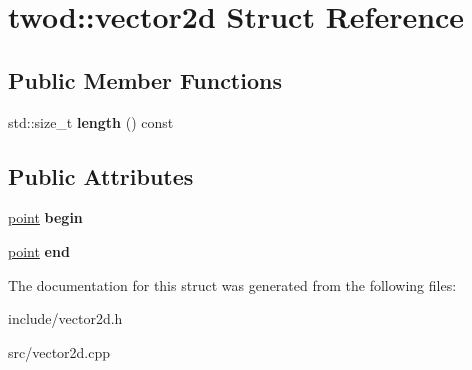 \hypertarget{structtwod_1_1vector2d}{}\section{twod\+:\+:vector2d Struct Reference}
\label{structtwod_1_1vector2d}
\subsection*{Public Member Functions}
\begin{DoxyCompactItemize}
\item 
\mbox{\label{structtwod_1_1vector2d_a6fa6f88e079c3cf58ee67935001eddfd}} 
std\+::size\+\_\+t {\bfseries length} () const
\end{DoxyCompactItemize}
\subsection*{Public Attributes}
\begin{DoxyCompactItemize}
\item 
\mbox{\label{structtwod_1_1vector2d_a549e1fd383dce218a88517d3cdbbede7}} 
\hyperlink{structtwod_1_1point__t}{point} {\bfseries begin}
\item 
\mbox{\label{structtwod_1_1vector2d_af08faedb9ce9a14990f7cc31e41ab66d}} 
\hyperlink{structtwod_1_1point__t}{point} {\bfseries end}
\end{DoxyCompactItemize}


The documentation for this struct was generated from the following files\+:\begin{DoxyCompactItemize}
\item 
include/vector2d.\+h\item 
src/vector2d.\+cpp\end{DoxyCompactItemize}
